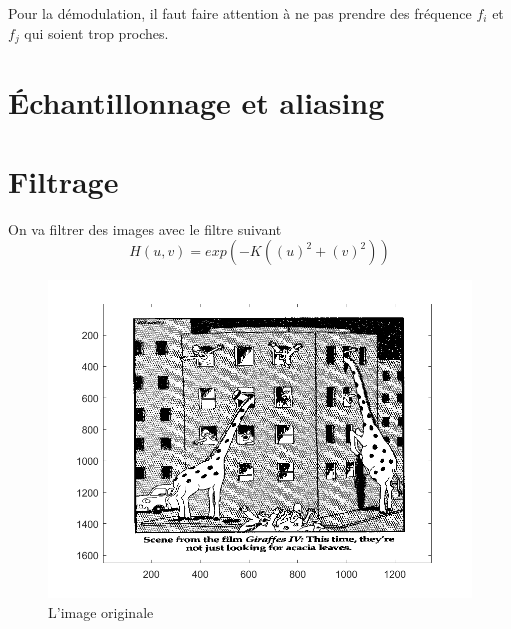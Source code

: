 \documentclass[10pt,a4paper]{article}
\begin{document}
Pour la démodulation, il faut faire attention à ne pas prendre des fréquence $f_i$ et $f_j$ qui soient trop proches.




\newpage

\section{Échantillonnage et aliasing	}

\section{Filtrage}

On va filtrer des images avec le filtre suivant
\[
	H(u,v) = exp(-K((u)^2+(v)^2))
\]
\begin{figure}[H]	\begin{center}
\includegraphics[scale=0.35]{girafe_originale.png}
\caption{L'image originale}
\label{XX}
\end{center}	\end{figure}
\end{document}

